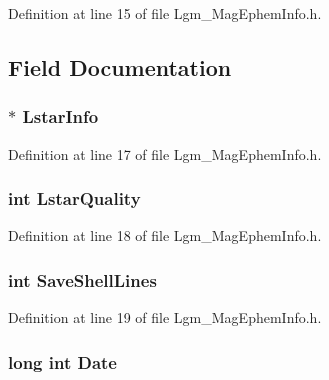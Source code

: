 Definition at line 15 of file Lgm\_\-MagEphemInfo.h.

\subsection{Field Documentation}
\hypertarget{struct_lgm___mag_ephem_info_e0b196f79d448339982446d78890b87f}{
\subsubsection[{LstarInfo}]{$\ast$ {\bf LstarInfo}}}
\label{struct_lgm___mag_ephem_info_e0b196f79d448339982446d78890b87f}




Definition at line 17 of file Lgm\_\-MagEphemInfo.h.\hypertarget{struct_lgm___mag_ephem_info_8a900c463a0e976afa63d5736adbe8df}{
\subsubsection[{LstarQuality}]{\setlength{\rightskip}{0pt plus 5cm}int {\bf LstarQuality}}}
\label{struct_lgm___mag_ephem_info_8a900c463a0e976afa63d5736adbe8df}




Definition at line 18 of file Lgm\_\-MagEphemInfo.h.\hypertarget{struct_lgm___mag_ephem_info_5e915118a580b5fdd3fc46cb0a09d618}{
\subsubsection[{SaveShellLines}]{\setlength{\rightskip}{0pt plus 5cm}int {\bf SaveShellLines}}}
\label{struct_lgm___mag_ephem_info_5e915118a580b5fdd3fc46cb0a09d618}




Definition at line 19 of file Lgm\_\-MagEphemInfo.h.\hypertarget{struct_lgm___mag_ephem_info_8c1b7b17183e48a6fafaf6302e1b1da9}{
\subsubsection[{Date}]{\setlength{\rightskip}{0pt plus 5cm}long int {\bf Date}}}
\label{struct_lgm___mag_ephem_info_8c1b7b17183e48a6fafaf6302e1b1da9}




